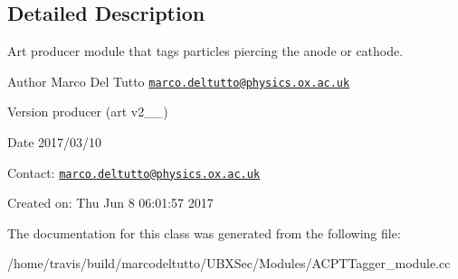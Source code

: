 \subsection{Detailed Description}
Art producer module that tags particles piercing the anode or cathode. 

\begin{DoxyAuthor}{Author}
Marco Del Tutto \href{mailto:marco.deltutto@physics.ox.ac.uk}{\tt marco.\-deltutto@physics.\-ox.\-ac.\-uk}
\end{DoxyAuthor}
\begin{DoxyVersion}{Version}
producer (art v2\-\_\-\_)
\end{DoxyVersion}
\begin{DoxyDate}{Date}
2017/03/10
\end{DoxyDate}
Contact\-: \href{mailto:marco.deltutto@physics.ox.ac.uk}{\tt marco.\-deltutto@physics.\-ox.\-ac.\-uk}

Created on\-: Thu Jun 8 06\-:01\-:57 2017 

The documentation for this class was generated from the following file\-:\begin{DoxyCompactItemize}
\item 
/home/travis/build/marcodeltutto/\-U\-B\-X\-Sec/\-Modules/A\-C\-P\-T\-Tagger\-\_\-module.\-cc\end{DoxyCompactItemize}
